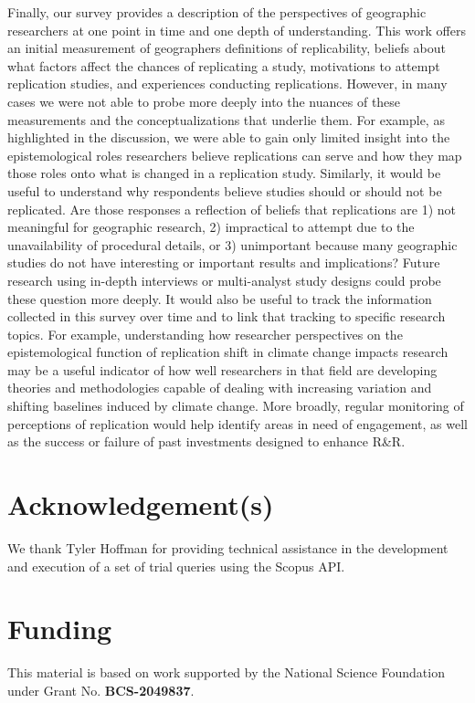 \documentclass[]{interact}
\theoremstyle{plain}%
\theoremstyle{definition}
\theoremstyle{remark}
\begin{document}
Finally, our survey provides a description of the perspectives of geographic researchers at one point in time and one depth of understanding.
This work offers an initial measurement of geographers definitions of replicability, beliefs about what factors affect the chances of replicating a study, motivations to attempt replication studies, and experiences conducting replications. 
However, in many cases we were not able to probe more deeply into the nuances of these measurements and the conceptualizations that underlie them.
For example, as highlighted in the discussion, we were able to gain only limited insight into the epistemological roles researchers believe replications can serve and how they map those roles onto what is changed in a replication study.
Similarly, it would be useful to understand why respondents believe studies should or should not be replicated. 
Are those responses a reflection of beliefs that replications are 1) not meaningful for geographic research, 2) impractical to attempt due to the unavailability of procedural details, or 3) unimportant because many geographic studies do not have interesting or important results and implications?
Future research using in-depth interviews or multi-analyst study designs could probe these question more deeply. 
It would also be useful to track the information collected in this survey over time and to link that tracking to specific research topics. 
For example, understanding how researcher perspectives on the epistemological function of replication shift in climate change impacts research may be a useful indicator of how well researchers in that field are developing theories and methodologies capable of dealing with increasing variation and shifting baselines induced by climate change.
More broadly, regular monitoring of perceptions of replication would help identify areas in need of engagement, as well as the success or failure of past investments designed to enhance R\&R. 


\theendnotes


\section*{Acknowledgement(s)}
We thank Tyler Hoffman for providing technical assistance in the development and execution of a set of trial queries using the Scopus API.

\section*{Funding}
This material is based on work supported by the National Science Foundation under Grant No. \textbf{BCS-2049837}.
\end{document}
